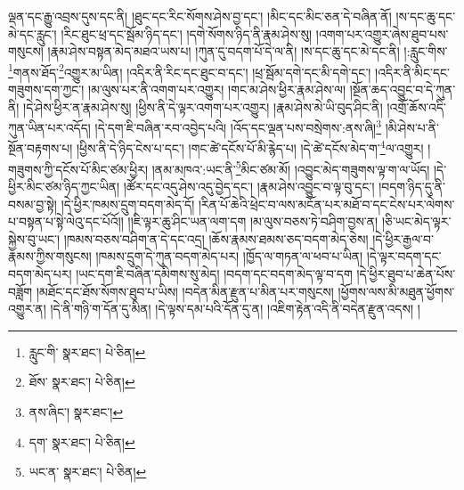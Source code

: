 ལྡན་དང་རྒྱུ་འབྲས་དུས་དང་ནི། །ཐུང་དང་རིང་སོགས་ཤེས་བྱ་དང་། །མིང་དང་མིང་ཅན་དེ་བཞིན་ནོ། །ས་དང་ཆུ་དང་མེ་དང་རླུང་། །རིང་ཐུང་ཕྲ་དང་སྦོམ་ཉིད་དང་། །དགེ་སོགས་ཉིད་ནི་རྣམ་ཤེས་སུ། །འགག་པར་འགྱུར་ཞེས་ཐུབ་པས་གསུངས། །རྣམ་ཤེས་བསྟན་མེད་མཐའ་ཡས་པ། །ཀུན་དུ་བདག་པོ་དེ་ལ་ནི། །ས་དང་ཆུ་དང་མེ་དང་ནི། །:རླུང་གིས་\footnote{རླུང་གི་  སྣར་ཐང་།  པེ་ཅིན། }གནས་ཐོད་\footnote{ཐོས་  སྣར་ཐང་།  པེ་ཅིན། }འགྱུར་མ་ཡིན། །འདིར་ནི་རིང་དང་ཐུང་བ་དང་། །ཕྲ་སྦོམ་དགེ་དང་མི་དགེ་དང་། །འདིར་ནི་མིང་དང་གཟུགས་དག་ཀྱང་། །མ་ལུས་པར་ནི་འགག་པར་འགྱུར། །གང་མ་ཤེས་ཕྱིར་རྣམ་ཤེས་ལ། །སྔོན་ཆད་འབྱུང་བ་དེ་ཀུན་ནི། །དེ་ཤེས་ཕྱིར་ན་རྣམ་ཤེས་སུ། །ཕྱིས་ནི་དེ་ལྟར་འགག་པར་འགྱུར། །རྣམ་ཤེས་མེ་ཡི་བུད་ཤིང་ནི། །འགྲོ་ཆོས་འདི་ཀུན་ཡིན་པར་འདོད། །དེ་དག་ཇི་བཞིན་རབ་འབྱེད་པའི། །འོད་དང་ལྡན་པས་བསྲེགས་:ནས་ཞི།\footnote{ནས་ཞིང་།  སྣར་ཐང་། } །མི་ཤེས་པ་ནི་སྔོན་བརྟགས་པ། །ཕྱིས་ནི་དེ་ཉིད་ངེས་པ་དང་། །གང་ཚེ་དངོས་པོ་མི་རྙེད་པ། །དེ་ཚེ་དངོས་མེད་ག་\footnote{དག་  སྣར་ཐང་།  པེ་ཅིན། }ལ་འགྱུར། །གཟུགས་ཀྱི་དངོས་པོ་མིང་ཙམ་ཕྱིར། །ནམ་མཁའ་:ཡང་ནི་\footnote{ཡང་ན་  སྣར་ཐང་།  པེ་ཅིན། }མིང་ཙམ་མོ། །འབྱུང་མེད་གཟུགས་ལྟ་ག་ལ་ཡོད། །དེ་ཕྱིར་མིང་ཙམ་ཉིད་ཀྱང་ཡིན། །ཚོར་དང་འདུ་ཤེས་འདུ་བྱེད་དང་། །རྣམ་ཤེས་འབྱུང་བ་ལྟ་བུ་དང་། །བདག་ཉིད་དུ་ནི་བསམ་བྱ་སྟེ། །དེ་ཕྱིར་ཁམས་དྲུག་བདག་མེད་དོ། །རིན་པོ་ཆེའི་ཕྲེང་བ་ལས་མངོན་པར་མཐོ་བ་དང་ངེས་པར་ལེགས་པ་བསྟན་པ་སྟེ་ལེའུ་དང་པོའོ།། །།ཇི་ལྟར་ཆུ་ཤིང་ཡན་ལག་དག །མ་ལུས་བཅས་ཏེ་བཤིག་བྱས་ན། །ཅི་ཡང་མེད་ལྟར་སྐྱེས་བུ་ཡང་། །ཁམས་བཅས་བཤིག་ན་དེ་དང་འདྲ། །ཆོས་རྣམས་ཐམས་ཅད་བདག་མེད་ཅེས། །དེ་ཕྱིར་རྒྱལ་བ་རྣམས་ཀྱིས་གསུངས། །ཁམས་དྲུག་དེ་ཀུན་བདག་མེད་པར། །ཁྱོད་ལ་གཏན་ལ་ཕབ་པ་ཡིན། །དེ་ལྟར་བདག་དང་བདག་མེད་པར། །ཡང་དག་ཇི་བཞིན་དམིགས་སུ་མེད། །བདག་དང་བདག་མེད་ལྟ་བ་དག །དེ་ཕྱིར་ཐུབ་པ་ཆེན་པོས་བཟློག །མཐོང་དང་ཐོས་སོགས་ཐུབ་པ་ཡིས། །བདེན་མིན་རྫུན་པ་མིན་པར་གསུངས། །ཕྱོགས་ལས་མི་མཐུན་ཕྱོགས་འགྱུར་ན། །དེ་ནི་གཉི་ག་དོན་དུ་མིན། །དེ་ལྟས་དམ་པའི་དོན་དུ་ན། །འཇིག་རྟེན་འདི་ནི་བདེན་རྫུན་འདས། །
